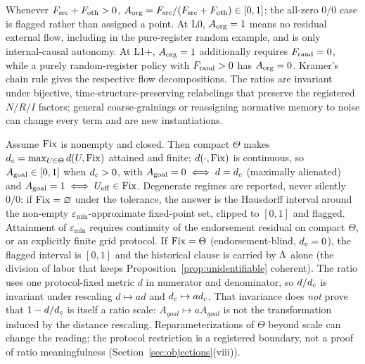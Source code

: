 \begin{proposition}[$\Aorg$]\label{prop:wd-org}
Whenever $F_{\mathrm{src}}+F_{\mathrm{oth}}>0$, $A_{\mathrm{org}}=F_{\mathrm{src}}/(F_{\mathrm{src}}+F_{\mathrm{oth}})\in[0,1]$;
the all-zero $0/0$ case is flagged rather than assigned a point. At L0,
$A_{\mathrm{org}}=1$ means no residual external flow, including in the pure-register
random example, and is only internal-causal autonomy. At L1+,
$A_{\mathrm{org}}=1$ additionally requires $F_{\mathrm{rand}}=0$, while a purely random-register
policy with $F_{\mathrm{rand}}>0$ has $A_{\mathrm{org}}=0$. Kramer's chain rule gives the respective
flow decompositions. The ratios are invariant under bijective,
time-structure-preserving relabelings that preserve the registered $N/R/I$
factors; general coarse-grainings or reassigning normative memory to noise can
change every term and are new instantiations.
\end{proposition}

\begin{proposition}[$\Agoal$]\label{prop:wd-goal}
Assume $\mathrm{Fix}$ is nonempty and closed. Then compact $\Theta$ makes
$d_{c}=\max_{U\in\Theta}d(U,\mathrm{Fix})$ attained and finite;
$d(\cdot,\mathrm{Fix})$ is continuous, so $A_{\mathrm{goal}}\in[0,1]$ when $d_{c}>0$, with
$A_{\mathrm{goal}}=0\iff d=d_{c}$ (maximally alienated) and $A_{\mathrm{goal}}=1\iff
U_{\mathrm{eff}}\in\mathrm{Fix}$. Degenerate regimes are reported, never silently $0/0$: if
$\mathrm{Fix}=\varnothing$ under the tolerance, the answer is the Hausdorff interval
around the non-empty $\varepsilon_{\min}$-approximate fixed-point set,
clipped to $[0,1]$ and flagged. Attainment of $\varepsilon_{\min}$ requires
continuity of the endorsement residual on compact $\Theta$, or an explicitly
finite grid protocol. If $\mathrm{Fix}=\Theta$ (endorsement-blind,
$d_{c}=0$), the flagged interval is $[0,1]$ and the historical clause is
carried by $\Lambda$ alone (the division of labor that keeps
Proposition~\ref{prop:unidentifiable} coherent). The ratio uses one protocol-fixed metric $d$ in numerator and denominator, so
$d/d_{c}$ is invariant under rescaling $d\mapsto ad$ and $d_{c}\mapsto ad_{c}$.
That invariance does \emph{not} prove that $1-d/d_{c}$ is itself a ratio scale:
$A_{goal}\mapsto aA_{goal}$ is not the transformation induced by the distance
rescaling. Reparameterizations of $\Theta$ beyond scale can change the
reading; the protocol restriction is a registered boundary, not a proof of
ratio meaningfulness (Section~\ref{sec:objections}\textup{(viii)}).
\end{proposition}

